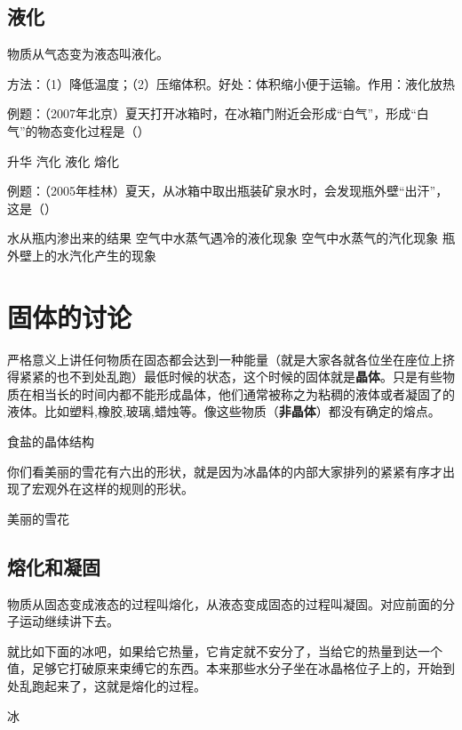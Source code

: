 \documentclass[12pt]{exam}
\begin{document}
\subsection{液化}
物质从气态变为液态叫液化。

方法：（1）降低温度；（2）压缩体积。好处：体积缩小便于运输。作用：液化放热

例题：（2007年北京）夏天打开冰箱时，在冰箱门附近会形成“白气”，形成“白气”的物态变化过程是（\answerline*[C]）

\begin{oneparchoices}
\choice 升华
\choice 汽化
\choice 液化
\choice 熔化
\end{oneparchoices}

例题：（2005年桂林）夏天，从冰箱中取出瓶装矿泉水时，会发现瓶外壁“出汗”，这是（\answerline*[B]）
\begin{choices}
\choice 水从瓶内渗出来的结果
\choice 空气中水蒸气遇冷的液化现象
\choice 空气中水蒸气的汽化现象
\choice 瓶外壁上的水汽化产生的现象
\end{choices}


\section{固体的讨论}
严格意义上讲任何物质在固态都会达到一种能量（就是大家各就各位坐在座位上挤得紧紧的也不到处乱跑）最低时候的状态，这个时候的固体就是\textbf{晶体}。只是有些物质在相当长的时间内都不能形成晶体，他们通常被称之为粘稠的液体或者凝固了的液体。比如塑料,橡胶,玻璃,蜡烛等。像这些物质（\textbf{非晶体}）都没有确定的熔点。
\begin{fig}{食盐的晶体结构}
\end{fig}

你们看美丽的雪花有六出的形状，就是因为冰晶体的内部大家排列的紧紧有序才出现了宏观外在这样的规则的形状。
\begin{linefig}{美丽的雪花}
\end{linefig}


\subsection{熔化和凝固}
物质从固态变成液态的过程叫熔化，从液态变成固态的过程叫凝固。对应前面的分子运动继续讲下去。

就比如下面的冰吧，如果给它热量，它肯定就不安分了，当给它的热量到达一个值，足够它打破原来束缚它的东西。本来那些水分子坐在冰晶格位子上的，开始到处乱跑起来了，这就是熔化的过程。
\begin{fig}{冰}
\end{fig}
\end{document}
